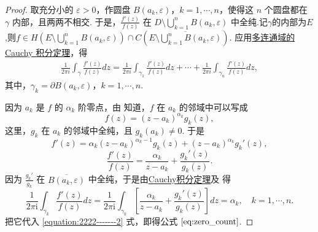 \documentclass[../../main.tex]{subfiles}
\begin{document}
\begin{proof} 
取充分小的 \( \varepsilon > 0 \)，作圆盘 \( B(a_k, \varepsilon) \)，\( k = 1, \cdots, n \)，使得这 \( n \) 个圆盘都在 \( \gamma \) 内部，且两两不相交. 于是，\( \frac{f'(z)}{f(z)} \) 在 \( D \setminus \bigcup_{k=1}^{n} B(a_k, \varepsilon) \) 中全纯.记$\gamma$的内部为$E$,则$f\in H\left(E\setminus \bigcup_{k=1}^{n} B(a_k, \varepsilon)\right)\cap C\left(\overline{E\setminus \bigcup_{k=1}^{n} B(a_k, \varepsilon)}\right)$. 应用\hyperref[theorem:定理3.2.5]{多连通域的 Cauchy 积分定理}，得
\begin{align}
\frac{1}{2\pi i} \int_{\gamma} \frac{f'(z)}{f(z)} dz = \frac{1}{2\pi i} \int_{\gamma_1} \frac{f'(z)}{f(z)} dz + \cdots + \frac{1}{2\pi i} \int_{\gamma_n} \frac{f'(z)}{f(z)} dz, \label{equation:2222-------2}
\end{align}
其中，\( \gamma_k = \partial B(a_k, \varepsilon) \)，\( k = 1, \cdots, n \).

因为 \( a_k \) 是 \( f \) 的 \( \alpha_k \) 阶零点，由 知道，\( f \) 在 \( a_k \) 的邻域中可以写成
\[
f(z) = (z - a_k)^{\alpha_k} g_k(z),
\]
这里，\( g_k \) 在 \( a_k \) 的邻域中全纯，且 \( g_k(a_k) \neq 0 \). 于是
\[
f'(z) = \alpha_k (z - a_k)^{\alpha_k - 1} g_k(z) + (z - a_k)^{\alpha_k} g_k'(z),
\]
\[
\frac{f'(z)}{f(z)} = \frac{\alpha_k}{z - a_k} + \frac{g_k'(z)}{g_k(z)}.
\]
因为 \( \frac{g_k'}{g_k} \) 在 \( \overline{B(a_k, \varepsilon)} \) 中全纯，于是由\hyperref[theorem:Cauchy-Goursat定理(Cauchy积分定理)]{Cauchy积分定理}及 得
\[
\frac{1}{2\pi \mathrm{i}}\int_{\gamma _k}{\frac{f' (z)}{f(z)}dz}=\frac{1}{2\pi \mathrm{i}}\int_{\gamma _k}{\left[ \frac{\alpha _k}{z-a_k}+\frac{g_k' (z)}{g_k(z)} \right] dz}=\alpha _k,\quad k=1,\cdots ,n.
\]
把它代入 \eqref{equation:2222-------2} 式，即得公式 \(\eqref{eq:zero_count}\).
\end{proof}
\end{document}
